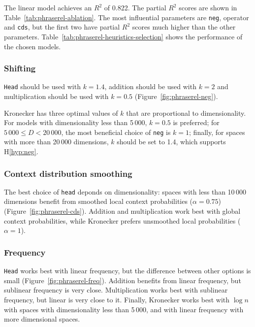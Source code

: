 
The linear model achieves an $R^2$ of 0.822. The partial $R^2$ scores are shown in Table~\ref{tab:phraserel-ablation}. The most influential parameters are \texttt{neg}, operator and \texttt{cds}, but the first two have partial $R^2$ scores much higher than the other parameters. Table~\ref{tab:phraserel-heuristics-selection} shows the performance of the chosen models.

\subsubsection{Shifting}
\label{sec:shifting-phraserel}

\texttt{Head} should be used with $k = 1.4$, addition should be used with $k = 2$ and multiplication should be used with $k = 0.5$ (Figure~\ref{fig:phraserel-neg}).

Kronecker has three optimal values of $k$ that are proportional to dimensionality. For models with dimensionality less than 5\,000, $k = 0.5$ is preferred; for $5\,000 \leq D < 20\,000$, the most beneficial choice of \texttt{neg} is $k = 1$; finally, for spaces with more than 20\,000 dimensions, $k$ should be set to 1.4, which supports H\ref{hyp:neg}.

\subsubsection{Context distribution smoothing}
\label{sec:cont-distr-smooth-phraserel}

The best choice of \texttt{head} deponds on dimensionality: spaces with less than 10\,000 dimensions benefit from smoothed local context probabilities ($\alpha = 0.75$) (Figure~\ref{fig:phraserel-cds}). Addition and multiplication work best with global context probabilities, while Kronecker prefers unsmoothed local probabilities ($\alpha = 1$).

\subsubsection{Frequency}
\label{sec:frequency-phraserel}

\texttt{Head} works best with linear frequency, but the difference between other options is small (Figure~\ref{fig:phraserel-freq}). Addition benefits from linear frequency, but sublinear frequency is very close. Multiplication works best with sublinear frequency, but linear is very close to it. Finally, Kronecker works best with $\log n$ with spaces with dimensionality less than 5\,000, and with linear frequency with more dimensional spaces.

